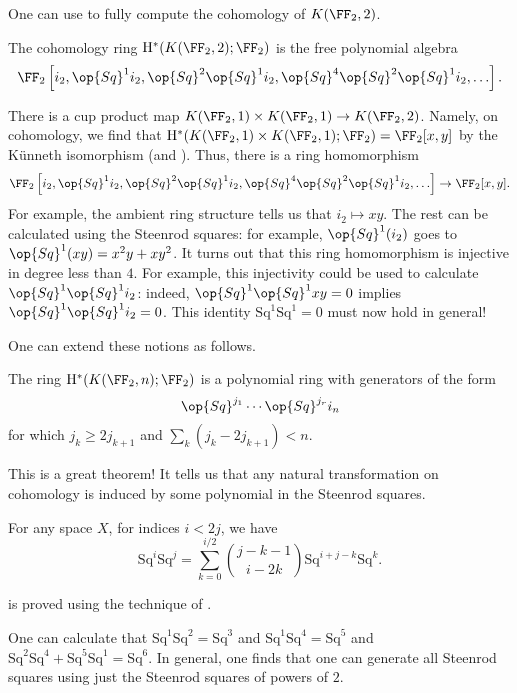 \documentclass[../notes.tex]{subfiles}
\begin{document}
One can use  to fully compute the cohomology of $K(\FF_2,2)$.
\begin{proposition}[Serre]
	The cohomology ring $\mathrm H^*(K(\FF_2,2);\FF_2)$ is the free polynomial algebra
	\[\FF_2\left[i_2,\op{Sq}^1i_2,\op{Sq}^2\op{Sq}^1i_2,\op{Sq}^4\op{Sq}^2\op{Sq}^1i_2,\ldots\right].\]
\end{proposition}
\begin{example} \label{ex:cup-product-k-f2}
	There is a cup product map $K(\FF_2,1)\times K(\FF_2,1)\to K(\FF_2,2)$. Namely, on cohomology, we find that $\mathrm H^*(K(\FF_2,1)\times K(\FF_2,1);\FF_2)=\FF_2[x,y]$ by the K\"unneth isomorphism (and ). Thus, there is a ring homomorphism
	\[\FF_2\left[i_2,\op{Sq}^1i_2,\op{Sq}^2\op{Sq}^1i_2,\op{Sq}^4\op{Sq}^2\op{Sq}^1i_2,\ldots\right]\to\FF_2[x,y].\]
	For example, the ambient ring structure tells us that $i_2\mapsto xy$. The rest can be calculated using the Steenrod squares: for example, $\op{Sq}^1(i_2)$ goes to $\op{Sq}^1(xy)=x^2y+xy^2$. It turns out that this ring homomorphism is injective in degree less than $4$. For example, this injectivity could be used to calculate $\op{Sq}^1\op{Sq}^1i_2$: indeed, $\op{Sq}^1\op{Sq}^1xy=0$ implies $\op{Sq}^1\op{Sq}^1i_2=0$. This identity $\mathrm{Sq}^1\mathrm{Sq}^1=0$ must now hold in general!
\end{example}
One can extend these notions as follows.
\begin{theorem}[Serre]
	The ring $\mathrm H^*(K(\FF_2,n);\FF_2)$ is a polynomial ring with generators of the form
	\[\op{Sq}^{j_1}\cdots\op{Sq}^{j_r}i_n\]
	for which $j_k\ge2j_{k+1}$ and $\sum_k(j_k-2j_{k+1})<n$.
\end{theorem}
\begin{remark}
	This is a great theorem! It tells us that any natural transformation on cohomology is induced by some polynomial in the Steenrod squares.
\end{remark}
\begin{theorem} \label{thm:squares-on-k-f2}
	For any space $X$, for indices $i<2j$, we have
	\[\mathrm{Sq}^i\mathrm{Sq}^j=\sum_{k=0}^{i/2}\binom{j-k-1}{i-2k}\mathrm{Sq}^{i+j-k}\mathrm{Sq}^k.\]
\end{theorem}
\begin{remark}
	 is proved using the technique of .
\end{remark}
\begin{example}
	One can calculate that $\mathrm{Sq}^1\mathrm{Sq}^2=\mathrm{Sq}^3$ and $\mathrm{Sq}^1\mathrm{Sq}^4=\mathrm{Sq}^5$ and $\mathrm{Sq}^2\mathrm{Sq}^4+\mathrm{Sq}^5\mathrm{Sq}^1=\mathrm{Sq}^6$. In general, one finds that one can generate all Steenrod squares using just the Steenrod squares of powers of $2$.
\end{example}
\end{document}

